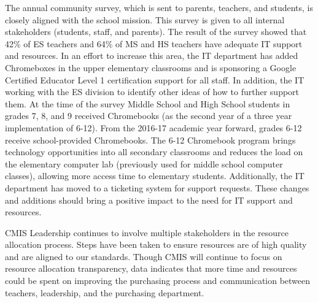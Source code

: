 \begin{findings}
The annual community survey, which is sent to parents, teachers, and students, is closely aligned with the school mission. This survey is given to all internal stakeholders (students, staff, and parents). The result of the survey showed that 42\% of ES teachers and 64\% of MS and HS teachers have adequate IT support and resources.  In an effort to increase this area, the IT department has added Chromeboxes in the upper elementary classrooms and is sponsoring a Google Certified Educator Level 1 certification support for all staff. In addition, the IT working with the ES division to identify other ideas of how to further support them. At the time of the survey Middle School and High School students in grades 7, 8, and 9 received Chromebooks (as the second year of a three year implementation of 6-12). From the 2016-17 academic year forward, grades 6-12 receive school-provided Chromebooks. The 6-12 Chromebook program brings technology opportunities into all secondary classrooms and reduces the load on the elementary computer lab (previously used for middle school computer classes), allowing more access time to elementary students. Additionally, the IT department has moved to a ticketing system for support requests. These changes and additions should bring a positive impact to the need for IT support and resources.


CMIS Leadership continues to involve multiple stakeholders in the resource allocation process. Steps have been taken to ensure resources are of high quality and are aligned to our standards. Though CMIS will continue to focus on resource allocation transparency, data indicates that more time and resources could be spent on improving the purchasing process and communication between teachers, leadership, and the purchasing department.  
\end{findings}




